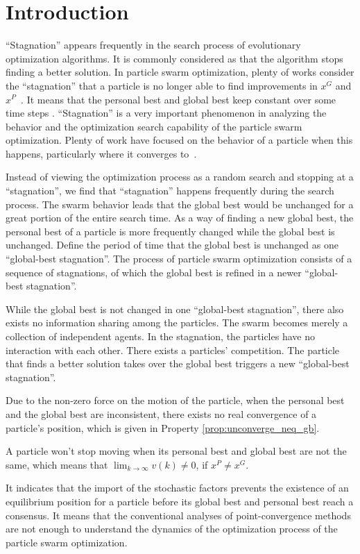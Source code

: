 \section{Introduction}
\label{sec:introduction}

``Stagnation'' appears frequently in the search process of evolutionary optimization algorithms. 
It is commonly considered as that the algorithm stops finding a better solution.
In particle swarm optimization,
plenty of works consider the ``stagnation'' that a particle is no longer able to find improvements in $ x^{G} $ and $ x^{P} $~\cite{Clerc06stagnationanalysis}.
It means that the personal best and global best keep constant over some time steps \cite{4223160}.
``Stagnation'' is a very important phenomenon in analyzing the behavior and the optimization search capability of the particle swarm optimization.
Plenty of work have focused on the behavior of a particle when this happens, particularly where it converges to~\cite{Schmitt:2013:PSO:2463372.2463563}\cite{Poli:2008:DSS:1384929.1384944}.

Instead of viewing the optimization process as a random search and stopping at a ``stagnation'', we find that ``stagnation'' happens frequently during the search process.
The swarm behavior leads that the global best would be unchanged for a great portion of the entire search time.
As a way of finding a new global best, the personal best of a particle is more frequently changed while the global best is unchanged. 
Define the period of time that the global best is unchanged as one ``global-best stagnation''.
The process of particle swarm optimization consists of a sequence of stagnations, of which the global best is refined in a newer ``global-best stagnation''.

While the global best is not changed in one ``global-best stagnation'', there also exists no information sharing among the particles.
The swarm becomes merely a collection of independent agents.
In the stagnation, the particles have no interaction with each other.
There exists a particles' competition.
The particle that finds a better solution takes over the global best triggers a new ``global-best stagnation''.

Due to the non-zero force on the motion of the particle, when the personal best and the global best are inconsistent, there exists no real convergence of a particle's position, which is given in Property \ref{prop:unconverge_neq_gb}.
\begin{myprop}
\label{prop:unconverge_neq_gb}
A particle won't stop moving when its personal best and global best are not the same, 
which means that 
$ \lim_{k \rightarrow \infty} v(k) \neq 0 $, if $ x^{P} \neq x^{G} $.
\end{myprop}
It indicates that the import of the stochastic factors prevents the existence of an equilibrium position for a particle before its global best and personal best reach a consensus.
It means that the conventional analyses of point-convergence methods are not enough to understand the dynamics of the optimization process of the particle swarm optimization.  